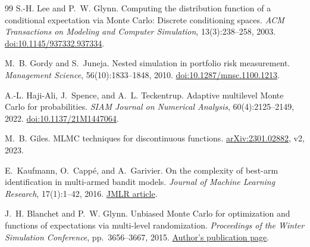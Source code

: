 \documentclass[11pt,a4paper]{article}
\theoremstyle{definition}
\begin{document}
\begin{thebibliography}{99}
S.-H. Lee and P.~W. Glynn.
\newblock Computing the distribution function of a conditional expectation
via Monte Carlo: Discrete conditioning spaces.
\newblock \emph{ACM Transactions on Modeling and Computer Simulation}, 13(3):238--258, 2003.
\newblock \href{https://doi.org/10.1145/937332.937334}{doi:10.1145/937332.937334}.

M.~B. Gordy and S.~Juneja.
\newblock Nested simulation in portfolio risk measurement.
\newblock \emph{Management Science}, 56(10):1833--1848, 2010.
\newblock \href{https://doi.org/10.1287/mnsc.1100.1213}{doi:10.1287/mnsc.1100.1213}.

A.-L. Haji-Ali, J.~Spence, and A.~L. Teckentrup.
\newblock Adaptive multilevel Monte Carlo for probabilities.
\newblock \emph{SIAM Journal on Numerical Analysis}, 60(4):2125--2149, 2022.
\newblock \href{https://doi.org/10.1137/21M1447064}{doi:10.1137/21M1447064}.

M.~B. Giles.
\newblock MLMC techniques for discontinuous functions.
\newblock \href{https://arxiv.org/abs/2301.02882}{arXiv:2301.02882}, v2, 2023.

E.~Kaufmann, O.~Capp\'e, and A.~Garivier.
\newblock On the complexity of best-arm identification in multi-armed bandit models.
\newblock \emph{Journal of Machine Learning Research}, 17(1):1--42, 2016.
\newblock \href{https://jmlr.org/papers/v17/kaufman16a.html}{JMLR article}.

J.~H. Blanchet and P.~W. Glynn.
\newblock Unbiased Monte Carlo for optimization and functions of expectations
via multi-level randomization.
\newblock \emph{Proceedings of the Winter Simulation Conference}, pp.~3656--3667, 2015.
\newblock \href{https://web.stanford.edu/~glynn/papers/2015/BlanchetG15.html}{Author's publication page}.
\end{thebibliography}
\end{document}
